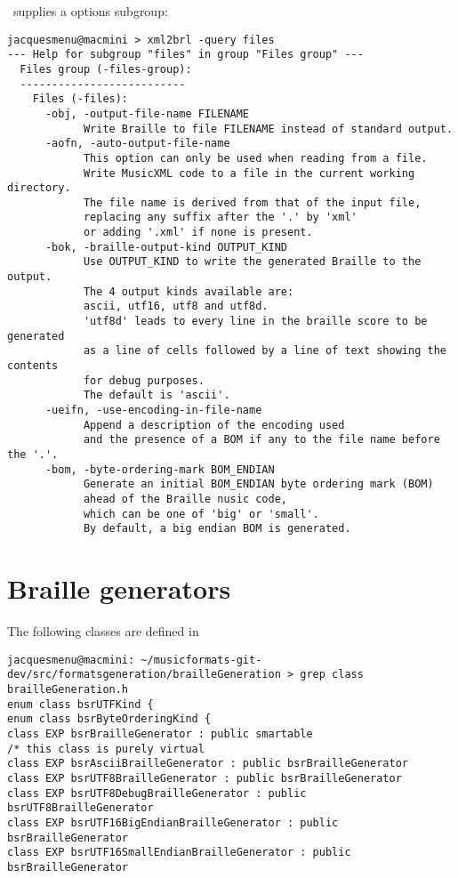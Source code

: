 \xmlToBrl\ supplies a  options subgroup:
\begin{lstlisting}[language=Terminal]
jacquesmenu@macmini > xml2brl -query files
--- Help for subgroup "files" in group "Files group" ---
  Files group (-files-group):
  --------------------------
    Files (-files):
      -obj, -output-file-name FILENAME
            Write Braille to file FILENAME instead of standard output.
      -aofn, -auto-output-file-name
            This option can only be used when reading from a file.
            Write MusicXML code to a file in the current working directory.
            The file name is derived from that of the input file,
            replacing any suffix after the '.' by 'xml'
            or adding '.xml' if none is present.
      -bok, -braille-output-kind OUTPUT_KIND
            Use OUTPUT_KIND to write the generated Braille to the output.
            The 4 output kinds available are:
            ascii, utf16, utf8 and utf8d.
            'utf8d' leads to every line in the braille score to be generated
            as a line of cells followed by a line of text showing the contents
            for debug purposes.
            The default is 'ascii'.
      -ueifn, -use-encoding-in-file-name
            Append a description of the encoding used
            and the presence of a BOM if any to the file name before the '.'.
      -bom, -byte-ordering-mark BOM_ENDIAN
            Generate an initial BOM_ENDIAN byte ordering mark (BOM)
            ahead of the Braille nusic code,
            which can be one of 'big' or 'small'.
            By default, a big endian BOM is generated.
\end{lstlisting}


\section{Braille generators}

The following classes are defined in 
\begin{lstlisting}[language=Terminal]
jacquesmenu@macmini: ~/musicformats-git-dev/src/formatsgeneration/brailleGeneration > grep class   brailleGeneration.h
enum class bsrUTFKind {
enum class bsrByteOrderingKind {
class EXP bsrBrailleGenerator : public smartable
/* this class is purely virtual
class EXP bsrAsciiBrailleGenerator : public bsrBrailleGenerator
class EXP bsrUTF8BrailleGenerator : public bsrBrailleGenerator
class EXP bsrUTF8DebugBrailleGenerator : public bsrUTF8BrailleGenerator
class EXP bsrUTF16BigEndianBrailleGenerator : public bsrBrailleGenerator
class EXP bsrUTF16SmallEndianBrailleGenerator : public bsrBrailleGenerator
\end{lstlisting}

